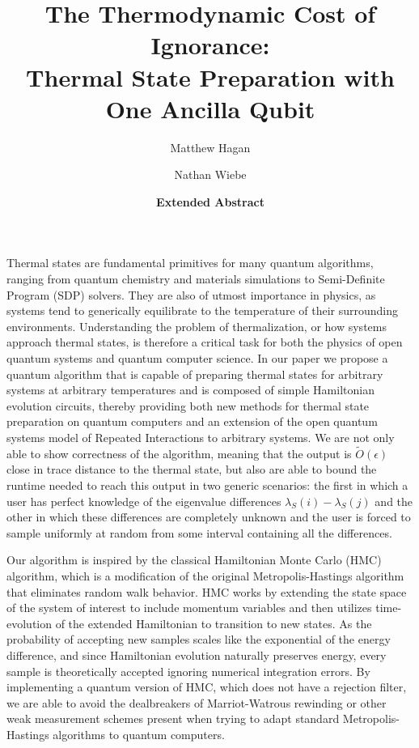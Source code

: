 \documentclass[11pt]{article}
\newcommand{\bigotilde}[1]{\widetilde{O} \left( #1 \right)}
\begin{document}
\title{The Thermodynamic Cost of Ignorance:\\ Thermal State Preparation with One Ancilla Qubit}

\author[1]{Matthew Hagan}
\author[1]{Nathan Wiebe}

\date{\textbf{Extended Abstract}}
\maketitle
Thermal states are fundamental primitives for many quantum algorithms, ranging from quantum chemistry and materials simulations to Semi-Definite Program (SDP) solvers. They are also of utmost importance in physics, as systems tend to generically equilibrate to the temperature of their surrounding environments. Understanding the problem of thermalization, or how systems approach thermal states, is therefore a critical task for both the physics of open quantum systems and quantum computer science. In our paper we propose a quantum algorithm that is capable of preparing thermal states for arbitrary systems at arbitrary temperatures and is composed of simple Hamiltonian evolution circuits, thereby providing both new methods for thermal state preparation on quantum computers and an extension of the open quantum systems model of Repeated Interactions to arbitrary systems. We are not only able to show correctness of the algorithm, meaning that the output is $\bigotilde{\epsilon}$ close in trace distance to the thermal state, but also are able to bound the runtime needed to reach this output in two generic scenarios: the first in which a user has perfect knowledge of the eigenvalue differences $\lambda_S(i) - \lambda_S(j)$ and the other in which these differences are completely unknown and the user is forced to sample uniformly at random from some interval containing all the differences.

Our algorithm is inspired by the classical Hamiltonian Monte Carlo (HMC) algorithm, which is a modification of the original Metropolis-Hastings algorithm that eliminates random walk behavior. HMC works by extending the state space of the system of interest to include momentum variables and then utilizes time-evolution of the extended Hamiltonian to transition to new states. As the probability of accepting new samples scales like the exponential of the energy difference, and since Hamiltonian evolution naturally preserves energy, every sample is theoretically accepted ignoring numerical integration errors. By implementing a quantum version of HMC, which does not have a rejection filter, we are able to avoid the dealbreakers of Marriot-Watrous rewinding \cite{temme2011} or other weak measurement schemes \cite{jiang2024quantummetropolissamplingweak} present when trying to adapt standard Metropolis-Hastings algorithms to quantum computers.
\end{document}

